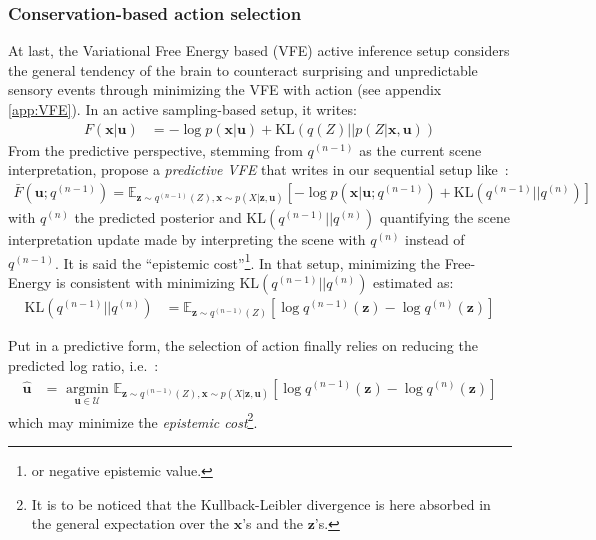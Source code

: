 \documentclass[12pt,twoside,openright]{article}
\begin{document}
\subsubsection{Conservation-based action selection}\label{sec:conservation}

At last, the  Variational Free Energy based (VFE) active inference setup \citep{friston2010free,friston2012perceptions} 
considers the general tendency of the brain to counteract surprising and unpredictable sensory events through minimizing the VFE with action (see appendix \ref{app:VFE}). In an active sampling-based setup, it writes:
\begin{align}
F(\boldsymbol{x}|\boldsymbol{u}) 
&= -\log p(\boldsymbol{x}|\boldsymbol{u}) + \text{KL}(q(Z)||p(Z|\boldsymbol{x},\boldsymbol{u}))
\label{eq:FEP-posterior-u}
\end{align}
From the predictive perspective, stemming from $q^{(n-1)}$ as the current scene interpretation, \citet{friston2017active} propose a \emph{predictive VFE} that writes in our sequential setup like~:
\begin{align}
\bar{F}(\boldsymbol{u}; q^{(n-1)}) = \mathbb{E}_{\boldsymbol{z} \sim q^{(n-1)}(Z), \boldsymbol{x} \sim p(X|\boldsymbol{z}, \boldsymbol{u})}
\left[-\log p(\boldsymbol{x}| \boldsymbol{u}; q^{(n-1)}) + \text{KL}(q^{(n-1)}||q^{(n)})\right]
\label{eq:ELBO}
\end{align}
with $q^{(n)}$ the predicted posterior and $\text{KL}(q^{(n-1)}||q^{(n)})$ quantifying the  scene interpretation update made by interpreting  the scene with $q^{(n)}$ instead of $q^{(n-1)}$.  It is said the ``epistemic cost''\footnote{or negative epistemic value.}.
In that setup, minimizing the Free-Energy is consistent with minimizing $\text{KL}(q^{(n-1)}||q^{(n)})$
estimated as:
\begin{align*}
\text{KL}(q^{(n-1)}||q^{(n)})
&= \mathbb{E}_{\boldsymbol{z} \sim q^{(n-1)}(Z)} \left[\log q^{(n-1)}(\boldsymbol{z}) - \log q^{(n)}(\boldsymbol{z})\right]
\end{align*}

Put in a predictive form, the selection of action finally relies on reducing the predicted log ratio, i.e.~:
\begin{align}
\hat{\boldsymbol{u}} &= \underset{\boldsymbol{u} \in \mathcal{U}}{\text{ argmin }} \mathbb{E}_{\boldsymbol{z} \sim q^{(n-1)}(Z), \boldsymbol{x} \sim p(X|\boldsymbol{z}, \boldsymbol{u})}\left[\log q^{(n-1)}(\boldsymbol{z}) - \log q^{(n)}(\boldsymbol{z})\right]
\end{align}
which may minimize the \emph{epistemic cost}\footnote{It is to be noticed  that the  Kullback-Leibler divergence is here absorbed in the general expectation over the $\boldsymbol{x}$'s and the $\boldsymbol{z}$'s.}.
\end{document}
